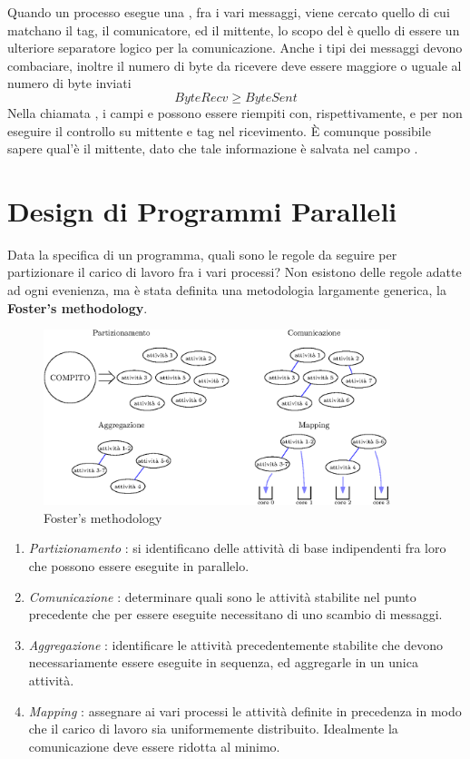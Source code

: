 \documentclass[10pt, letterpaper]{report}
\begin{document}
Quando un processo esegue una , fra i vari messaggi, viene cercato quello di cui matchano il tag, il 
comunicatore, ed il mittente, lo scopo del  è quello di essere un ulteriore separatore logico per 
la comunicazione. Anche i tipi dei messaggi devono combaciare, inoltre il numero di byte da ricevere deve essere 
maggiore o uguale al numero di byte inviati 
$$ ByteRecv\ge ByteSent$$
Nella chiamata , i campi  e  possono essere riempiti con, rispettivamente,
 e  per non eseguire il controllo su mittente e tag nel ricevimento. 
È comunque possibile sapere qual'è il mittente, dato che tale informazione è salvata nel campo .
\flowerLine 
\section{Design di Programmi Paralleli}
Data la specifica di un programma, quali sono le regole da seguire per partizionare il carico di lavoro fra i vari 
processi? Non esistono delle regole adatte ad ogni evenienza, ma  è stata definita una metodologia largamente generica, 
la \textbf{Foster's methodology}.
\begin{figure}[h!]
    \centering
    \includegraphics[width=0.9\textwidth]{images/foster.eps}
    \caption{Foster's methodology}
    \label{fig:foster}
\end{figure}
\begin{enumerate}
    \item \textit{Partizionamento} : si identificano delle attività di base indipendenti fra loro che possono essere
    eseguite in parallelo.
    \item \textit{Comunicazione} : determinare quali sono le attività stabilite nel punto precedente che per essere 
    eseguite necessitano di uno scambio di messaggi. 
    \item \textit{Aggregazione} : identificare le attività precedentemente stabilite che devono necessariamente essere 
    eseguite in sequenza, ed aggregarle in un unica attività.
    \item \textit{Mapping} : assegnare ai vari processi le attività definite in precedenza in modo che il carico di 
    lavoro sia uniformemente distribuito. Idealmente la comunicazione deve essere ridotta al minimo.
\end{enumerate}
\end{document}
